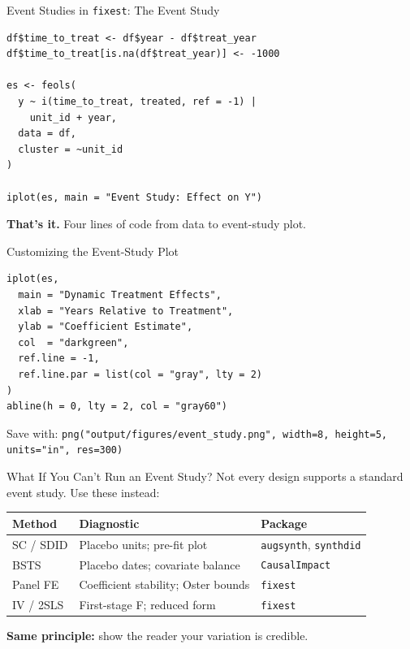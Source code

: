 \begin{frame}[fragile]{Event Studies in \texttt{fixest}: The Event Study}
\begin{lstlisting}[style=terminal, basicstyle=\ttfamily\footnotesize\color{darkgray}]
df$time_to_treat <- df$year - df$treat_year
df$time_to_treat[is.na(df$treat_year)] <- -1000

es <- feols(
  y ~ i(time_to_treat, treated, ref = -1) |
    unit_id + year,
  data = df,
  cluster = ~unit_id
)

iplot(es, main = "Event Study: Effect on Y")
\end{lstlisting}

  \vspace{4pt}

  \textbf{That's it.} Four lines of code from data to event-study plot.
\end{frame}

\begin{frame}[fragile]{Customizing the Event-Study Plot}
\begin{lstlisting}[style=terminal, basicstyle=\ttfamily\footnotesize\color{darkgray}]
iplot(es,
  main = "Dynamic Treatment Effects",
  xlab = "Years Relative to Treatment",
  ylab = "Coefficient Estimate",
  col  = "darkgreen",
  ref.line = -1,
  ref.line.par = list(col = "gray", lty = 2)
)
abline(h = 0, lty = 2, col = "gray60")
\end{lstlisting}

  \vspace{2pt}

  Save with: \texttt{png("output/figures/event\_study.png", width=8, height=5, units="in", res=300)}
\end{frame}

\begin{frame}{What If You Can't Run an Event Study?}
  \small
  Not every design supports a standard event study. Use these instead:

  \vspace{4pt}

  \begin{tabular}{@{}p{2.8cm}p{4cm}p{3.5cm}@{}}
    \toprule
    \textbf{Method} & \textbf{Diagnostic} & \textbf{Package} \\
    \midrule
    SC / SDID & Placebo units; pre-fit plot & \texttt{augsynth}, \texttt{synthdid} \\[2pt]
    BSTS & Placebo dates; covariate balance & \texttt{CausalImpact} \\[2pt]
    Panel FE & Coefficient stability; Oster bounds & \texttt{fixest} \\[2pt]
    IV / 2SLS & First-stage F; reduced form & \texttt{fixest} \\
    \bottomrule
  \end{tabular}

  \vspace{4pt}

  \textbf{Same principle:} show the reader your variation is credible.
\end{frame}

